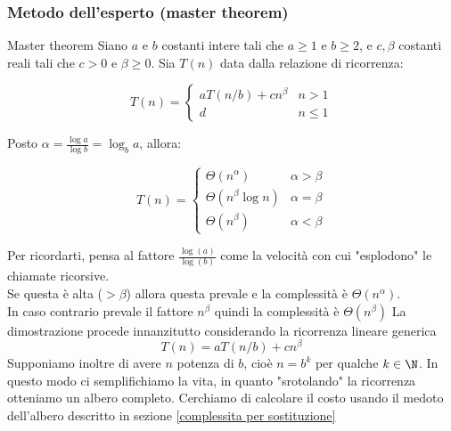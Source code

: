 \subsubsection{Metodo dell'esperto (master theorem)}
\begin{definizione}{Master theorem}
	Siano $ a $ e $ b $ costanti intere tali che $ a \geq 1 $ e $ b \geq 2 $, e $ c, \beta $ costanti reali tali che $ c > 0 $ e $ \beta \geq 0 $. Sia $ T(n) $ data dalla relazione di ricorrenza:

	\[
		T(n) =
		\begin{cases}
			aT(n/b) + cn^\beta & n > 1    \\
			d                  & n \leq 1
		\end{cases}
	\]

	Posto $ \alpha = \frac{\log a}{\log b} = \log_b a $, allora:

	\[
		T(n) =
		\begin{cases}
			\Theta(n^\alpha)        & \alpha > \beta \\
			\Theta(n^\beta  \log n) & \alpha = \beta \\
			\Theta(n^\beta)         & \alpha < \beta
		\end{cases}
	\]
\end{definizione}\label{master theorem}
Per ricordarti, pensa al fattore $ \frac{\log \left(a\right)}{\log \left(b\right)} $ come la velocità con cui "esplodono" le chiamate ricorsive. \\
Se questa è alta ($ > \beta  $) allora questa prevale e la complessità è $ \Theta \left(n^{\alpha }\right) $. \\
In caso contrario prevale il fattore $ n^{\beta } $ quindi la complessità è $ \Theta \left(n^{\beta }\right) $
\vskip3mm
La dimostrazione procede innanzitutto considerando la ricorrenza lineare generica
\[
	T(n) = aT(n/b) + cn^{\beta }
\]
Supponiamo inoltre di avere $ n $ potenza di $ b $, cioè $ n = b^k $ per qualche $ k \in \N $. In questo modo ci semplifichiamo la vita, in quanto "srotolando" la ricorrenza otteniamo un albero completo.
Cerchiamo di calcolare il costo usando il medoto dell'albero descritto in sezione \ref{complessita per sostituzione}

